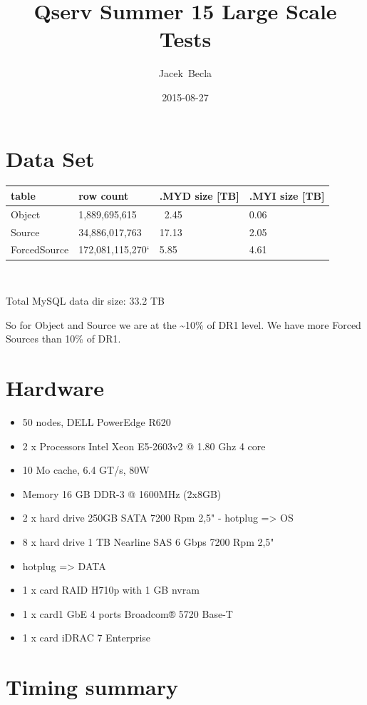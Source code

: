 \documentclass[DM,toc]{lsstdoc}
\title[Qserv Test Summer 2015]{Qserv Summer 15 Large Scale Tests}
\author{Jacek~Becla}
\date{2015-08-27}
\begin{document}
\maketitle


\section{Data Set}\label{data-set}

\begin{longtable}[]{@{}llll@{}}
\toprule
\textbf{table} & \textbf{row count} & \textbf{.MYD size {[}TB{]}} &
\textbf{.MYI size {[}TB{]}}\tabularnewline
\midrule
\endhead
Object & 1,889,695,615 & ~2.45 & 0.06\tabularnewline
Source & 34,886,017,763 & 17.13 & 2.05\tabularnewline
ForcedSource & 172,081,115,270` & 5.85 & 4.61\tabularnewline
\bottomrule
\end{longtable}

~

Total MySQL data dir size: 33.2 TB

So for Object and Source we are at the \textasciitilde{}10\% of DR1
level. We have more Forced Sources than 10\% of DR1.

\section{Hardware}\label{hardware}

\begin{itemize}
\item
  50 nodes, DELL PowerEdge R620
\item
  2 x Processors Intel Xeon E5-2603v2 @ 1.80 Ghz 4 core
\item
  10 Mo cache, 6.4 GT/s, 80W
\item
  Memory 16 GB DDR-3 @ 1600MHz (2x8GB)
\item
  2 x hard drive 250GB SATA 7200 Rpm 2,5" - hotplug =\textgreater{} OS
\item
  8 x hard drive 1 TB Nearline SAS 6 Gbps 7200 Rpm 2,5"
\item
  hotplug =\textgreater{} DATA
\item
  1 x card RAID H710p with 1 GB nvram
\item
  1 x card1 GbE 4 ports Broadcom® 5720 Base-T
\item
  1 x card iDRAC 7 Enterprise
\end{itemize}

\section{Timing summary}\label{timing-summary}
\end{document}
